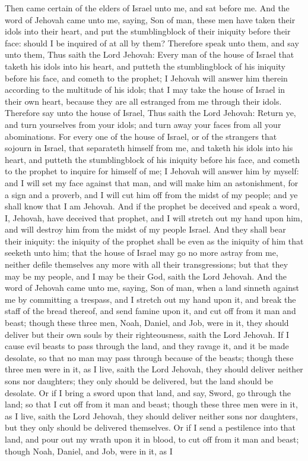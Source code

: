 Then came certain of the elders of Israel unto me, and sat before me. And the word of Jehovah came unto me, saying, Son of man, these men have taken their idols into their heart, and put the stumblingblock of their iniquity before their face: should I be inquired of at all by them? Therefore speak unto them, and say unto them, Thus saith the Lord Jehovah: Every man of the house of Israel that taketh his idols into his heart, and putteth the stumblingblock of his iniquity before his face, and cometh to the prophet; I Jehovah will answer him therein according to the multitude of his idols; that I may take the house of Israel in their own heart, because they are all estranged from me through their idols.  Therefore say unto the house of Israel, Thus saith the Lord Jehovah: Return ye, and turn yourselves from your idols; and turn away your faces from all your abominations. For every one of the house of Israel, or of the strangers that sojourn in Israel, that separateth himself from me, and taketh his idols into his heart, and putteth the stumblingblock of his iniquity before his face, and cometh to the prophet to inquire for himself of me; I Jehovah will answer him by myself: and I will set my face against that man, and will make him an astonishment, for a sign and a proverb, and I will cut him off from the midst of my people; and ye shall know that I am Jehovah. And if the prophet be deceived and speak a word, I, Jehovah, have deceived that prophet, and I will stretch out my hand upon him, and will destroy him from the midst of my people Israel. And they shall bear their iniquity: the iniquity of the prophet shall be even as the iniquity of him that seeketh unto him; that the house of Israel may go no more astray from me, neither defile themselves any more with all their transgressions; but that they may be my people, and I may be their God, saith the Lord Jehovah.  And the word of Jehovah came unto me, saying, Son of man, when a land sinneth against me by committing a trespass, and I stretch out my hand upon it, and break the staff of the bread thereof, and send famine upon it, and cut off from it man and beast; though these three men, Noah, Daniel, and Job, were in it, they should deliver but their own souls by their righteousness, saith the Lord Jehovah. If I cause evil beasts to pass through the land, and they ravage it, and it be made desolate, so that no man may pass through because of the beasts; though these three men were in it, as I live, saith the Lord Jehovah, they should deliver neither sons nor daughters; they only should be delivered, but the land should be desolate. Or if I bring a sword upon that land, and say, Sword, go through the land; so that I cut off from it man and beast; though these three men were in it, as I live, saith the Lord Jehovah, they should deliver neither sons nor daughters, but they only should be delivered themselves. Or if I send a pestilence into that land, and pour out my wrath upon it in blood, to cut off from it man and beast; though Noah, Daniel, and Job, were in it, as I 